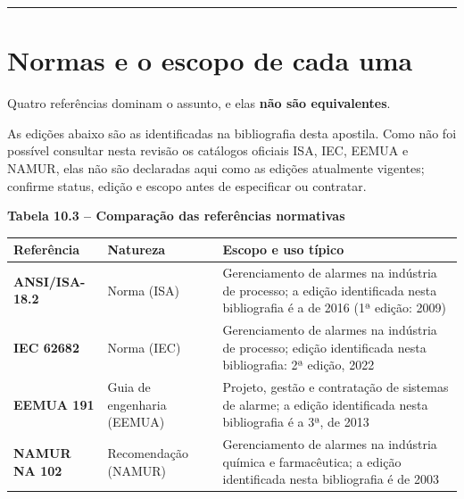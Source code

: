 \begin{center}\rule{0.5\linewidth}{0.5pt}\end{center}

\section{Normas e o escopo de cada uma}\label{normas-e-o-escopo-de-cada-uma}

Quatro referências dominam o assunto, e elas \textbf{não são equivalentes}.

As edições abaixo são as identificadas na bibliografia desta apostila. Como não foi possível
consultar nesta revisão os catálogos oficiais ISA, IEC, EEMUA e NAMUR, elas não são declaradas aqui
como as edições atualmente vigentes; confirme status, edição e escopo antes de especificar ou
contratar.

\textbf{Tabela 10.3 -- Comparação das referências normativas}

\begin{longtable}[]{@{}
  >{\raggedright\arraybackslash}p{}
  >{\raggedright\arraybackslash}p{}
  >{\raggedright\arraybackslash}p{}@{}}
\toprule\noalign{}
\begin{minipage}[b]{\linewidth}\raggedright
Referência
\end{minipage} & \begin{minipage}[b]{\linewidth}\raggedright
Natureza
\end{minipage} & \begin{minipage}[b]{\linewidth}\raggedright
Escopo e uso típico
\end{minipage} \\
\midrule\noalign{}
\endhead
\bottomrule\noalign{}
\endlastfoot
\textbf{ANSI/ISA-18.2} & Norma (ISA) & Gerenciamento de alarmes na indústria de processo; a edição identificada nesta bibliografia é a de 2016 (1ª edição: 2009) \\
\textbf{IEC 62682} & Norma (IEC) & Gerenciamento de alarmes na indústria de processo; edição identificada nesta bibliografia: 2ª edição, 2022 \\
\textbf{EEMUA 191} & Guia de engenharia (EEMUA) & Projeto, gestão e contratação de sistemas de alarme; a edição identificada nesta bibliografia é a 3ª, de 2013 \\
\textbf{NAMUR NA 102} & Recomendação (NAMUR) & Gerenciamento de alarmes na indústria química e farmacêutica; a edição identificada nesta bibliografia é de 2003 \\
\end{longtable}


